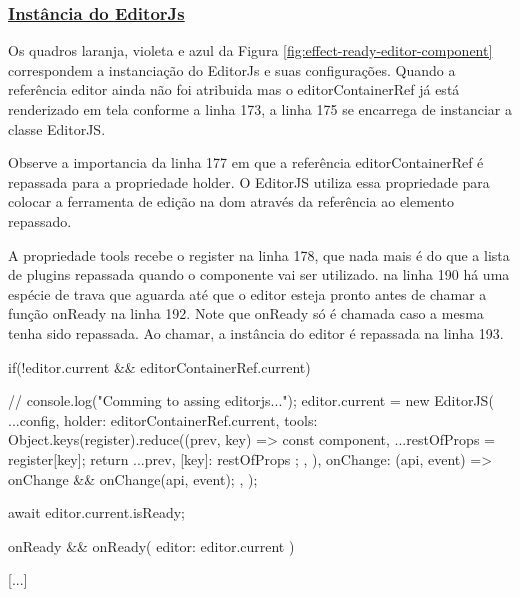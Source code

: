 \begin{Code00e304024aed40f7b142fa9af03154ea}
[...]
    return <Context.Provider value={{
        editor: editor.current
    }}>
        <div style={{ display: 'none' }}>
            { pluginsRender }
            { inlinePluginsRender }
        </div>
        <div ref={ editorContainerRef } ></div>
    </Context.Provider>
}
\end{Code00e304024aed40f7b142fa9af03154ea}

\subsubsection{\underline{Instância do EditorJs}}

Os quadros laranja, violeta e azul da
Figura \ref{fig:effect-ready-editor-component}
correspondem a instanciação do EditorJs e suas configurações.
Quando a referência editor ainda não foi atribuida mas o editorContainerRef
já está renderizado em tela conforme a linha 173, a linha 175 se encarrega
de instanciar a classe EditorJS.

Observe a importancia da linha 177 em que a referência editorContainerRef
é repassada para a propriedade holder. O EditorJS utiliza essa propriedade para
colocar a ferramenta de edição na
\acrshort{dom}
através da referência ao elemento repassado.

A propriedade tools recebe o register na linha 178, que nada mais é do que a lista
de plugins repassada quando o componente vai ser utilizado.
na linha 190 há uma espécie de trava que aguarda até que o editor esteja pronto
antes de chamar a função onReady na linha 192. Note que onReady só é chamada caso
a mesma tenha sido repassada. Ao chamar, a instância do editor é repassada na linha
193.

\begin{Code8be7f7e8345241f7af3e5eea6047f79e}
[...]
if(!editor.current && editorContainerRef.current){
    // console.log("Comming to assing editorjs...");
    editor.current = new EditorJS({
        ...config,
        holder: editorContainerRef.current,
        tools: Object.keys(register).reduce((prev, key) => {
            const { component, ...restOfProps } = register[key];
            return {
                ...prev,
                [key]: restOfProps
            };
        }, {}),
        onChange: (api, event) => {
            onChange && onChange(api, event);
        },
    });

    await editor.current.isReady;

    onReady && onReady({
        editor: editor.current
    })
}
[...]
\end{Code8be7f7e8345241f7af3e5eea6047f79e}

